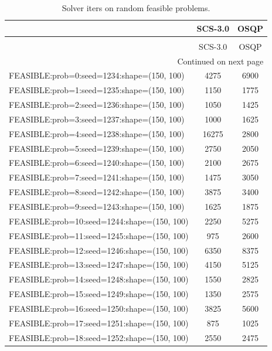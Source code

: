\begin{longtable}{lcc}
\caption{Solver iters on random feasible problems.}
\label{t-random feasible-iters}\\
\toprule
{} &  SCS-3.0 &  OSQP \\
\midrule
\endfirsthead
\caption[]{Solver iters on random feasible problems.} \\
\toprule
{} &  SCS-3.0 &  OSQP \\
\midrule
\endhead
\midrule
\multicolumn{3}{r}{{Continued on next page}} \\
\midrule
\endfoot

\bottomrule
\endlastfoot
FEASIBLE:prob=0:seed=1234:shape=(150, 100)   &     4275 &  6900 \\
FEASIBLE:prob=1:seed=1235:shape=(150, 100)   &     1150 &  1775 \\
FEASIBLE:prob=2:seed=1236:shape=(150, 100)   &     1050 &  1425 \\
FEASIBLE:prob=3:seed=1237:shape=(150, 100)   &     1000 &  1625 \\
FEASIBLE:prob=4:seed=1238:shape=(150, 100)   &    16275 &  2800 \\
FEASIBLE:prob=5:seed=1239:shape=(150, 100)   &     2750 &  2050 \\
FEASIBLE:prob=6:seed=1240:shape=(150, 100)   &     2100 &  2675 \\
FEASIBLE:prob=7:seed=1241:shape=(150, 100)   &     1475 &  3050 \\
FEASIBLE:prob=8:seed=1242:shape=(150, 100)   &     3875 &  3400 \\
FEASIBLE:prob=9:seed=1243:shape=(150, 100)   &     1625 &  1875 \\
FEASIBLE:prob=10:seed=1244:shape=(150, 100)  &     2250 &  5275 \\
FEASIBLE:prob=11:seed=1245:shape=(150, 100)  &      975 &  2600 \\
FEASIBLE:prob=12:seed=1246:shape=(150, 100)  &     6350 &  8375 \\
FEASIBLE:prob=13:seed=1247:shape=(150, 100)  &     4150 &  5125 \\
FEASIBLE:prob=14:seed=1248:shape=(150, 100)  &     1550 &  2825 \\
FEASIBLE:prob=15:seed=1249:shape=(150, 100)  &     1350 &  2575 \\
FEASIBLE:prob=16:seed=1250:shape=(150, 100)  &     3825 &  5600 \\
FEASIBLE:prob=17:seed=1251:shape=(150, 100)  &      875 &  1025 \\
FEASIBLE:prob=18:seed=1252:shape=(150, 100)  &     2550 &  2475 \\

\end{longtable}
